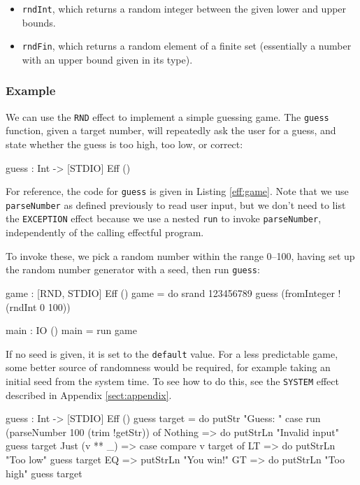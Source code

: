 \begin{itemize}
\item \texttt{rndInt}, which returns a random integer between the given lower and upper bounds.
\item \texttt{rndFin}, which returns a random element of a finite set (essentially
a number with an upper bound given in its type).
\end{itemize}

\subsubsection*{Example}

We can use the \texttt{RND} effect to implement a simple guessing game.
The \texttt{guess} function, given a target number, will repeatedly ask the
user for a guess, and state whether the guess is too high, too low, or
correct:

\begin{code}
guess : Int -> { [STDIO] } Eff ()
\end{code}

\noindent
For reference, the code for \texttt{guess} is given in Listing \ref{eff:game}.
Note that we use \texttt{parseNumber} as defined previously 
to read user input, but we don't need to list the \texttt{EXCEPTION} effect
because we use a nested \texttt{run} to invoke \texttt{parseNumber},
independently of the calling effectful program.

To invoke these, we pick a random number within the range 0--100, having
set up the random number generator with a seed, then run \texttt{guess}:

\begin{code}
game : { [RND, STDIO] } Eff ()
game = do srand 123456789
          guess (fromInteger !(rndInt 0 100))

main : IO ()
main = run game
\end{code}

\noindent
If no seed is given, it is set to the \texttt{default} value. For a less
predictable game, some better source of randomness would be required, for
example taking an initial seed from the system time. To see how to do
this, see the \texttt{SYSTEM} effect described in Appendix \ref{sect:appendix}.

\begin{code}[frame=single,float,label=eff:game,caption={Guessing Game}]
guess : Int -> { [STDIO] } Eff ()
guess target
    = do putStr "Guess: "
         case run (parseNumber 100 (trim !getStr)) of
              Nothing => do putStrLn "Invalid input"
                            guess target
              Just (v ** _) =>
                         case compare v target of
                             LT => do putStrLn "Too low"
                                      guess target
                             EQ => putStrLn "You win!"
                             GT => do putStrLn "Too high"
                                      guess target
\end{code}

